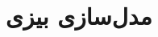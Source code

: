 \documentclass[11pt,a4paper,openany]{book}
\begin{document}
\frontmatter\tableofcontents
\mainmatter
\chapter{مدل‌سازی بیزی}
\end{document}
